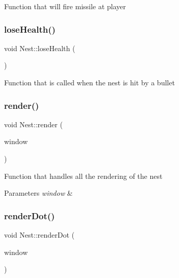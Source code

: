 Function that will fire missile at player 

\mbox{\label{class_nest_ab0943cc2a2ee21734835e0b909f5bdf5}} 
\subsubsection{\texorpdfstring{loseHealth()}{loseHealth()}}
{\footnotesize\ttfamily void Nest\+::lose\+Health (\begin{DoxyParamCaption}{ }\end{DoxyParamCaption})}



Function that is called when the nest is hit by a bullet 

\mbox{\label{class_nest_a09d907a3d411da0249c7d0bb5ad7b36c}} 
\subsubsection{\texorpdfstring{render()}{render()}}
{\footnotesize\ttfamily void Nest\+::render (\begin{DoxyParamCaption}\item[{sf\+::\+Render\+Window \&}]{window }\end{DoxyParamCaption})}



Function that handles all the rendering of the nest 


\begin{DoxyParams}{Parameters}
{\em window} & \\
\hline
\end{DoxyParams}
\mbox{\label{class_nest_abb94bc33eb34d32c3ddb209a777728ab}} 
\subsubsection{\texorpdfstring{renderDot()}{renderDot()}}
{\footnotesize\ttfamily void Nest\+::render\+Dot (\begin{DoxyParamCaption}\item[{sf\+::\+Render\+Window \&}]{window }\end{DoxyParamCaption})}



